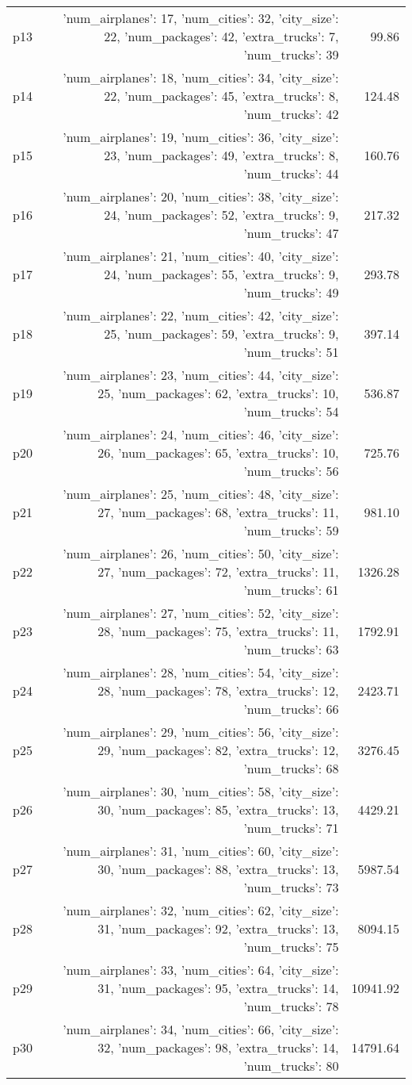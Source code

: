 \documentclass{article}
\begin{document}
\begin{center}
\begin{tabular}{@{}l|r|r@{}}
  p13&{'num\_airplanes': 17, 'num\_cities': 32, 'city\_size': 22, 'num\_packages': 42, 'extra\_trucks': 7, 'num\_trucks': 39}&99.86\\
  p14&{'num\_airplanes': 18, 'num\_cities': 34, 'city\_size': 22, 'num\_packages': 45, 'extra\_trucks': 8, 'num\_trucks': 42}&124.48\\
  p15&{'num\_airplanes': 19, 'num\_cities': 36, 'city\_size': 23, 'num\_packages': 49, 'extra\_trucks': 8, 'num\_trucks': 44}&160.76\\
  p16&{'num\_airplanes': 20, 'num\_cities': 38, 'city\_size': 24, 'num\_packages': 52, 'extra\_trucks': 9, 'num\_trucks': 47}&217.32\\
  p17&{'num\_airplanes': 21, 'num\_cities': 40, 'city\_size': 24, 'num\_packages': 55, 'extra\_trucks': 9, 'num\_trucks': 49}&293.78\\
  p18&{'num\_airplanes': 22, 'num\_cities': 42, 'city\_size': 25, 'num\_packages': 59, 'extra\_trucks': 9, 'num\_trucks': 51}&397.14\\
  p19&{'num\_airplanes': 23, 'num\_cities': 44, 'city\_size': 25, 'num\_packages': 62, 'extra\_trucks': 10, 'num\_trucks': 54}&536.87\\
  p20&{'num\_airplanes': 24, 'num\_cities': 46, 'city\_size': 26, 'num\_packages': 65, 'extra\_trucks': 10, 'num\_trucks': 56}&725.76\\
  p21&{'num\_airplanes': 25, 'num\_cities': 48, 'city\_size': 27, 'num\_packages': 68, 'extra\_trucks': 11, 'num\_trucks': 59}&981.10\\
  p22&{'num\_airplanes': 26, 'num\_cities': 50, 'city\_size': 27, 'num\_packages': 72, 'extra\_trucks': 11, 'num\_trucks': 61}&1326.28\\
  p23&{'num\_airplanes': 27, 'num\_cities': 52, 'city\_size': 28, 'num\_packages': 75, 'extra\_trucks': 11, 'num\_trucks': 63}&1792.91\\
  p24&{'num\_airplanes': 28, 'num\_cities': 54, 'city\_size': 28, 'num\_packages': 78, 'extra\_trucks': 12, 'num\_trucks': 66}&2423.71\\
  p25&{'num\_airplanes': 29, 'num\_cities': 56, 'city\_size': 29, 'num\_packages': 82, 'extra\_trucks': 12, 'num\_trucks': 68}&3276.45\\
  p26&{'num\_airplanes': 30, 'num\_cities': 58, 'city\_size': 30, 'num\_packages': 85, 'extra\_trucks': 13, 'num\_trucks': 71}&4429.21\\
  p27&{'num\_airplanes': 31, 'num\_cities': 60, 'city\_size': 30, 'num\_packages': 88, 'extra\_trucks': 13, 'num\_trucks': 73}&5987.54\\
  p28&{'num\_airplanes': 32, 'num\_cities': 62, 'city\_size': 31, 'num\_packages': 92, 'extra\_trucks': 13, 'num\_trucks': 75}&8094.15\\
  p29&{'num\_airplanes': 33, 'num\_cities': 64, 'city\_size': 31, 'num\_packages': 95, 'extra\_trucks': 14, 'num\_trucks': 78}&10941.92\\
  p30&{'num\_airplanes': 34, 'num\_cities': 66, 'city\_size': 32, 'num\_packages': 98, 'extra\_trucks': 14, 'num\_trucks': 80}&14791.64
                            \end{tabular}
                            \end{center}
                    
\end{document}
